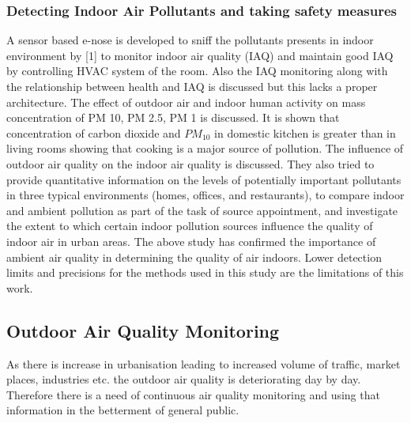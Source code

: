 \subsubsection{Detecting Indoor Air Pollutants and taking safety measures \cite{19}}
A sensor based e-nose is developed to sniff the pollutants presents in indoor environment by [1] to monitor indoor air quality (IAQ) and maintain good IAQ by controlling HVAC system of the room. Also the IAQ monitoring along with the relationship between health and IAQ is discussed but this lacks a proper architecture. The effect of outdoor air and indoor human activity on mass concentration of PM 10, PM 2.5, PM 1 is discussed. It is shown that concentration of carbon dioxide and $PM_{10}$ in domestic kitchen is greater than in living rooms showing that cooking is a major source of pollution. The influence of outdoor air quality on the indoor air quality is discussed. They also tried to provide quantitative information on the levels of potentially important pollutants in three typical environments (homes, offices, and restaurants), to compare indoor and ambient pollution as part of the task of source appointment, and investigate the extent to which certain indoor pollution sources influence the quality of indoor air in urban areas. The above study has confirmed the importance of ambient air quality in determining the quality of air indoors. Lower detection limits and precisions for the methods used in this study are the limitations of this work.

\subsection{Outdoor Air Quality Monitoring}
As there is increase in urbanisation leading to increased volume of traffic, market places, industries etc. the outdoor air quality is deteriorating day by day. Therefore there is a need of continuous air quality monitoring and using that information in the betterment of general public.

